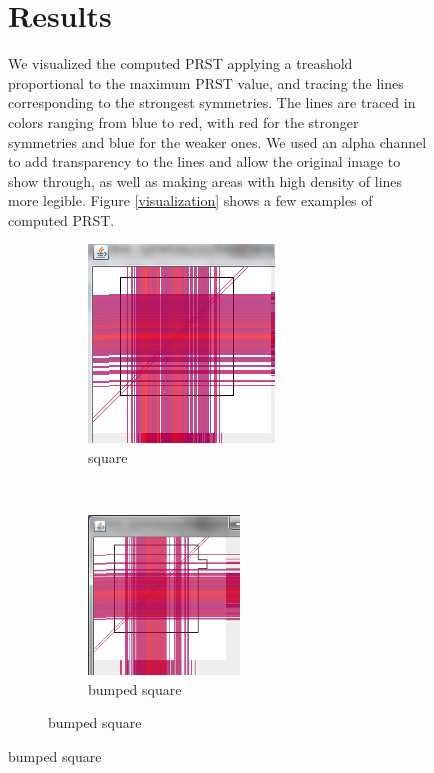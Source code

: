 \documentclass[10pt,a4paper]{article}			%
\begin{document}
\begin{figure}[h]
  	
  	\section{Results}

We visualized the computed PRST applying a treashold proportional to the maximum PRST value, and tracing the lines corresponding to the strongest symmetries. The lines are traced in colors ranging from blue to red, with red for the stronger symmetries and blue for the weaker ones. We used an alpha channel to add transparency to the lines and allow the original image to show through, as well as making areas with high density of lines more legible. Figure \ref{visualization} shows a few examples of computed PRST.

\begin{figure}[h]
        \centering
        \begin{subfigure}{120 pt}
                \includegraphics[height=120 pt]{img/carre2_5000.png}
                \caption{square}
                \label{square}
        \end{subfigure}
        ~
        \begin{subfigure}{120 pt}
                \includegraphics[height = 120pt]{img/carre3_5000_bis.png}
                \caption{bumped square}
                \label{bump_square}
        \end{subfigure}
       

\end{figure}
\end{figure}
\end{document}
